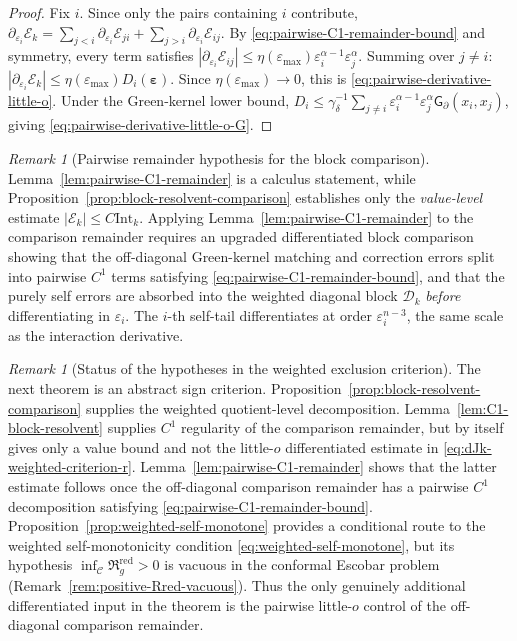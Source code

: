 \documentclass[11pt,reqno,a4paper]{amsart}
\numberwithin{equation}{section}
\theoremstyle{plain}
\theoremstyle{remark}
\newtheorem{remark}[theorem]{Remark}
\theoremstyle{plain}
\begin{document}
\begin{proof}
Fix $i$. Since only the pairs containing $i$ contribute,
$\partial_{\varepsilon_i}\mathcal E_k
=\sum_{j<i}\partial_{\varepsilon_i}\mathcal E_{ji}
+\sum_{j>i}\partial_{\varepsilon_i}\mathcal E_{ij}$.
By \eqref{eq:pairwise-C1-remainder-bound} and symmetry, every term satisfies
$|\partial_{\varepsilon_i}\mathcal E_{ij}|
\le \eta(\varepsilon_{\max})\varepsilon_i^{\alpha-1}\varepsilon_j^{\alpha}$.
Summing over $j\neq i$:
$|\partial_{\varepsilon_i}\mathcal E_k|
\le \eta(\varepsilon_{\max})D_i(\boldsymbol\varepsilon)$.
Since $\eta(\varepsilon_{\max})\to0$, this is \eqref{eq:pairwise-derivative-little-o}.
Under the Green-kernel lower bound,
$D_i\le\gamma_\delta^{-1}\sum_{j\neq i}\varepsilon_i^{\alpha-1}\varepsilon_j^{\alpha}
\mathsf G_\partial(x_i,x_j)$,
giving \eqref{eq:pairwise-derivative-little-o-G}.
\end{proof}

\begin{remark}[Pairwise remainder hypothesis for the block comparison]
\label{rem:pairwise-verification}
Lemma~\ref{lem:pairwise-C1-remainder} is a calculus statement, while
Proposition~\ref{prop:block-resolvent-comparison} establishes only the
\emph{value-level} estimate
$|\mathcal E_k|\le C\mathrm{Int}_k$.
Applying Lemma~\ref{lem:pairwise-C1-remainder} to the comparison remainder
requires an upgraded differentiated block comparison showing that
the off-diagonal Green-kernel matching and correction errors split into
pairwise $C^1$ terms satisfying \eqref{eq:pairwise-C1-remainder-bound}, and
that the purely self errors are absorbed into the weighted diagonal block
$\mathcal D_k$ \emph{before} differentiating in $\varepsilon_i$.
The $i$-th self-tail differentiates at order $\varepsilon_i^{n-3}$,
the same scale as the interaction derivative.
\end{remark}

\begin{remark}[Status of the hypotheses in the weighted exclusion criterion]
\label{rem:weighted-exclusion-hypotheses-status}
The next theorem is an abstract sign criterion.  Proposition~\ref{prop:block-resolvent-comparison} supplies the
weighted quotient-level decomposition.  Lemma~\ref{lem:C1-block-resolvent} supplies $C^1$ regularity of the
comparison remainder, but by itself gives only a value bound and not the little-$o$ differentiated estimate in
\eqref{eq:dJk-weighted-criterion-r}.  Lemma~\ref{lem:pairwise-C1-remainder} shows that the latter estimate
follows once the off-diagonal comparison remainder has a pairwise $C^1$ decomposition satisfying
\eqref{eq:pairwise-C1-remainder-bound}.  Proposition~\ref{prop:weighted-self-monotone}
provides a conditional route to the weighted self-monotonicity condition
\eqref{eq:weighted-self-monotone}, but its hypothesis
$\inf_{\mathcal C}\mathfrak R_g^{\mathrm{red}}>0$ is vacuous in the conformal
Escobar problem (Remark~\ref{rem:positive-Rred-vacuous}).
Thus the only genuinely additional differentiated input in the theorem is
the pairwise little-$o$ control of the off-diagonal comparison remainder.
\end{remark}
\end{document}
